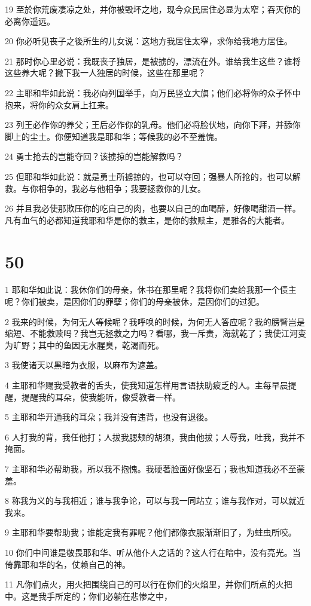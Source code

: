 \par 19 至於你荒废凄凉之处，并你被毁坏之地，现今众民居住必显为太窄；吞灭你的必离你遥远。
\par 20 你必听见丧子之後所生的儿女说：这地方我居住太窄，求你给我地方居住。
\par 21 那时你心里必说：我既丧子独居，是被掳的，漂流在外。谁给我生这些？谁将这些养大呢？撇下我一人独居的时候，这些在那里呢？
\par 22 主耶和华如此说：我必向列国举手，向万民竖立大旗；他们必将你的众子怀中抱来，将你的众女肩上扛来。
\par 23 列王必作你的养父；王后必作你的乳母。他们必将脸伏地，向你下拜，并舔你脚上的尘土。你便知道我是耶和华；等候我的必不至羞愧。
\par 24 勇士抢去的岂能夺回？该掳掠的岂能解救吗？
\par 25 但耶和华如此说：就是勇士所掳掠的，也可以夺回；强暴人所抢的，也可以解救。与你相争的，我必与他相争；我要拯救你的儿女。
\par 26 并且我必使那欺压你的吃自己的肉，也要以自己的血喝醉，好像喝甜酒一样。凡有血气的必都知道我耶和华是你的救主，是你的救赎主，是雅各的大能者。

\chapter{50}

\par 1 耶和华如此说：我休你们的母亲，休书在那里呢？我将你们卖给我那一个债主呢？你们被卖，是因你们的罪孽；你们的母亲被休，是因你们的过犯。
\par 2 我来的时候，为何无人等候呢？我呼唤的时候，为何无人答应呢？我的膀臂岂是缩短、不能救赎吗？我岂无拯救之力吗？看哪，我一斥责，海就乾了；我使江河变为旷野；其中的鱼因无水腥臭，乾渴而死。
\par 3 我使诸天以黑暗为衣服，以麻布为遮盖。
\par 4 主耶和华赐我受教者的舌头，使我知道怎样用言语扶助疲乏的人。主每早晨提醒，提醒我的耳朵，使我能听，像受教者一样。
\par 5 主耶和华开通我的耳朵；我并没有违背，也没有退後。
\par 6 人打我的背，我任他打；人拔我腮颊的胡须，我由他拔；人辱我，吐我，我并不掩面。
\par 7 主耶和华必帮助我，所以我不抱愧。我硬著脸面好像坚石；我也知道我必不至蒙羞。
\par 8 称我为义的与我相近；谁与我争论，可以与我一同站立；谁与我作对，可以就近我来。
\par 9 主耶和华要帮助我；谁能定我有罪呢？他们都像衣服渐渐旧了，为蛀虫所咬。
\par 10 你们中间谁是敬畏耶和华、听从他仆人之话的？这人行在暗中，没有亮光。当倚靠耶和华的名，仗赖自己的神。
\par 11 凡你们点火，用火把围绕自己的可以行在你们的火焰里，并你们所点的火把中。这是我手所定的；你们必躺在悲惨之中，

